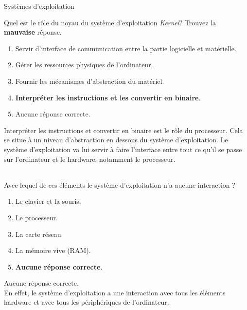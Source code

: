 \begin{section}{Systèmes d'exploitation}
    \begin{Exercice}[2 minutes]
        Quel est le rôle du noyau du système d'exploitation \textit{Kernel}? Trouvez la \textbf{mauvaise} réponse.
        \begin{enumerate}
            \item Servir d'interface de communication entre la partie logicielle et matérielle.
            \item Gérer les ressources physiques de l'ordinateur.
            \item Fournir les mécanismes d'abstraction du matériel.
            \item \textbf{Interpréter les instructions et les convertir en binaire}.
            \item Aucune réponse correcte.
        \end{enumerate}
    \end{Exercice}
    \begin{solution}
                Interpréter les instructions et convertir en binaire est le rôle du processeur. Cela se situe à un niveau d'abstraction en dessous du système d'exploitation. 
		Le système d'exploitation va lui servir à faire l'interface entre tout ce qu'il se passe sur l'ordinateur et le hardware, notamment le processeur.
    \end{solution}
    
    \begin{Exercice}[2 minutes]\\
    Avec lequel de ces éléments le système d'exploitation n'a aucune interaction ?
        \begin{enumerate}
            \item Le clavier et la souris.
            \item Le processeur.
            \item La carte réseau.
            \item La mémoire vive (RAM).
            \item \textbf{Aucune réponse correcte}.
        \end{enumerate}
    \end{Exercice}
    \begin{solution}
            Aucune réponse correcte. \\
	    
	    En effet, le système d'exploitation a une interaction avec tous les éléments hardware et avec tous les périphériques de l'ordinateur. \\
    \end{solution}


\end{section}
